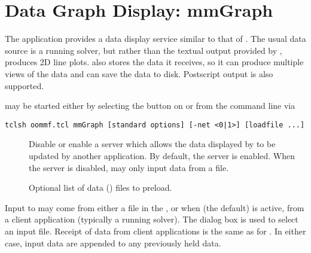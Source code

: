 \section{Data Graph Display: mmGraph}\label{sec:mmgraph}%

\begin{center}
\end{center}

The application  provides a data display service similar to
that of .  The usual
data source is a running solver, but rather than the textual output
provided by ,  produces 2D line plots.
 also stores the data it receives, so it can produce
multiple views of the data and can save the data to disk.  Postscript
output is also supported.

 may be started either by selecting the {}
button on  or from the command
line via
\begin{verbatim}
tclsh oommf.tcl mmGraph [standard options] [-net <0|1>] [loadfile ...]
\end{verbatim}

\begin{description}
\item[]
  Disable or enable a server which allows the data displayed by
   to be updated by another application.
  By default, the server is enabled.  When the server is disabled,
   may only input data from a file.
\item[]
  Optional list of data (\ODT) files to preload.
\end{description}

Input to  may come from either a file in the 
, 
or when  (the default) is active, from a client application
(typically a running solver).  The
 dialog box is used to select an input file.
Receipt of data from client applications is the same as for
.  In either
case, input data are appended to any previously held data.

